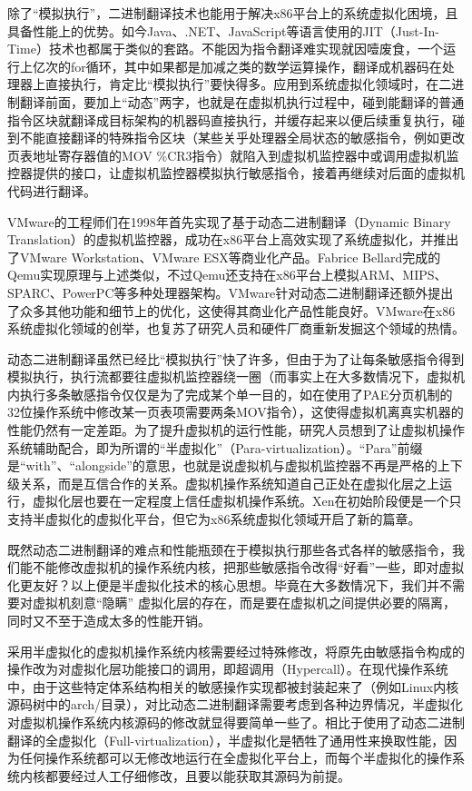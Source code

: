 除了``模拟执行''，二进制翻译技术也能用于解决x86平台上的系统虚拟化困境，且具备性能上的优势。如今Java、.NET、JavaScript等语言使用的JIT（Just-In-Time）技术也都属于类似的套路。不能因为指令翻译难实现就因噎废食，一个运行上亿次的for循环，其中如果都是加减之类的数学运算操作，翻译成机器码在处理器上直接执行，肯定比``模拟执行''要快得多。应用到系统虚拟化领域时，在二进制翻译前面，要加上``动态''两字，也就是在虚拟机执行过程中，碰到能翻译的普通指令区块就翻译成目标架构的机器码直接执行，并缓存起来以便后续重复执行，碰到不能直接翻译的特殊指令区块（某些关乎处理器全局状态的敏感指令，例如更改页表地址寄存器值的MOV \%CR3指令）就陷入到虚拟机监控器中或调用虚拟机监控器提供的接口，让虚拟机监控器模拟执行敏感指令，接着再继续对后面的虚拟机代码进行翻译。

VMware的工程师们在1998年首先实现了基于动态二进制翻译（Dynamic Binary Translation）的虚拟机监控器，成功在x86平台上高效实现了系统虚拟化，并推出了VMware Workstation、VMware ESX等商业化产品。Fabrice Bellard完成的Qemu实现原理与上述类似，不过Qemu还支持在x86平台上模拟ARM、MIPS、SPARC、PowerPC等多种处理器架构。VMware针对动态二进制翻译还额外提出了众多其他功能和细节上的优化，这使得其商业化产品性能良好。VMware在x86系统虚拟化领域的创举，也复苏了研究人员和硬件厂商重新发掘这个领域的热情。

动态二进制翻译虽然已经比``模拟执行''快了许多，但由于为了让每条敏感指令得到模拟执行，执行流都要往虚拟机监控器绕一圈（而事实上在大多数情况下，虚拟机内执行多条敏感指令仅仅是为了完成某个单一目的，如在使用了PAE分页机制的32位操作系统中修改某一页表项需要两条MOV指令），这使得虚拟机离真实机器的性能仍然有一定差距。为了提升虚拟机的运行性能，研究人员想到了让虚拟机操作系统辅助配合，即为所谓的``半虚拟化''（Para-virtualization）。``Para''前缀是``with''、``alongside''的意思，也就是说虚拟机与虚拟机监控器不再是严格的上下级关系，而是互信合作的关系。虚拟机操作系统知道自己正处在虚拟化层之上运行，虚拟化层也要在一定程度上信任虚拟机操作系统。Xen在初始阶段便是一个只支持半虚拟化的虚拟化平台，但它为x86系统虚拟化领域开启了新的篇章。

既然动态二进制翻译的难点和性能瓶颈在于模拟执行那些各式各样的敏感指令，我们能不能修改虚拟机的操作系统内核，把那些敏感指令改得``好看''一些，即对虚拟化更友好？以上便是半虚拟化技术的核心思想。毕竟在大多数情况下，我们并不需要对虚拟机刻意``隐瞒'' 虚拟化层的存在，而是要在虚拟机之间提供必要的隔离，同时又不至于造成太多的性能开销。

采用半虚拟化的虚拟机操作系统内核需要经过特殊修改，将原先由敏感指令构成的操作改为对虚拟化层功能接口的调用，即超调用（Hypercall）。在现代操作系统中，由于这些特定体系结构相关的敏感操作实现都被封装起来了（例如Linux内核源码树中的arch/目录），对比动态二进制翻译需要考虑到各种边界情况，半虚拟化对虚拟机操作系统内核源码的修改就显得要简单一些了。相比于使用了动态二进制翻译的全虚拟化（Full-virtualization），半虚拟化是牺牲了通用性来换取性能，因为任何操作系统都可以无修改地运行在全虚拟化平台上，而每个半虚拟化的操作系统内核都要经过人工仔细修改，且要以能获取其源码为前提。

